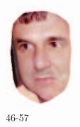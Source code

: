 \begin{figure}[t]
\begin{subfigure}[t]{0.2\textwidth}
		\includegraphics[width=\textwidth]{ilaware_cover5.png}
		\caption{46-57}
	\end{subfigure}
	\begin{subfigure}[t]{0.2\textwidth}

\end{subfigure}
\end{figure}
